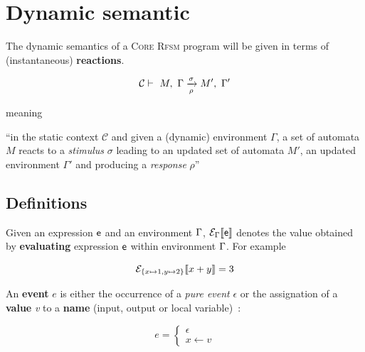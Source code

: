 \section{Dynamic semantic}
\label{sec:dynamic-semantics}

The dynamic semantics of a \textsc{Core Rfsm} program will be given in terms of (instantaneous)
\textbf{reactions}.

\begin{eqnarray*}
  \mathcal{C} \vdash\ M,\ \Gamma \xrightarrow[\rho]{\sigma} M',\ \Gamma' 
\end{eqnarray*}

meaning

\begin{center}
``in the static context $\mathcal{C}$ and given a (dynamic) environment $\Gamma$, a set of
automata $M$ reacts to a \emph{stimulus} $\sigma$ leading to an updated set of automata $M'$, an
updated environment $\Gamma'$ and producing a \emph{response} $\rho$''
\end{center}

\subsection*{Definitions}
\label{sec:dynsem-defs}

\step Given an expression $\mathsf{e}$ and an environment $\Gamma$, $\mathcal{E}_{\Gamma}\llbracket \mathsf{e} \rrbracket$ denotes the value obtained by
\textbf{evaluating} expression $\mathsf{e}$ within environment $\Gamma$. For example

$$
\mathcal{E}_{\{x\mapsto 1,y\mapsto 2\}}\llbracket x+y \rrbracket = 3
$$

\medskip \step An \textbf{event} $e$ is either the occurrence of a \emph{pure event}
$\epsilon$ or the assignation of a \textbf{value} \emph{v} to a \textbf{name} (input, output or
local variable)~:

\begin{equation*}
  e = \begin{cases}
             \epsilon \\
             x \gets v
             \end{cases}
\end{equation*}

